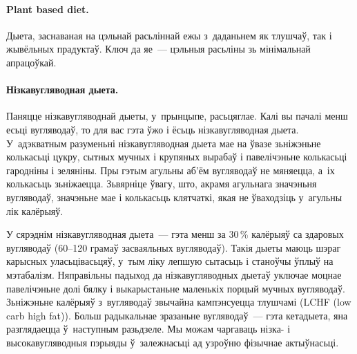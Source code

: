 \paragraph{Plant based diet.}
Дыета, заснаваная на цэльнай расьліннай ежы з~даданьнем як тлушчаў, так і жывёльных прадуктаў. Ключ да яе~--- цэльныя расьліны зь мінімальнай апрацоўкай.

\paragraph{Нізкавугляводная дыета.}
Паняцце нізкавугляводнай дыеты, у~прынцыпе, расьцяглае. Калі вы пачалі менш есьці вугляводаў, то для вас гэта ўжо і ёсьць нізкавугляводная дыета. У~адэкватным разуменьні нізкавугляводная дыета мае на ўвазе зьніжэньне колькасьці цукру, сытных мучных і крупяных вырабаў і павелічэньне колькасьці гародніны і зеляніны. Пры гэтым агульны аб'ём вугляводаў не мяняецца, а~іх колькасьць зьніжаецца. Зьвярніце ўвагу, што, акрамя агульнага значэньня вугляводаў, значэньне мае і колькасьць клятчаткі, якая не ўваходзіць у~агульны лік калёрыяў.

У сярэднім нізкавугляводная дыета~--- гэта менш за 30\,\% калёрыяў са здаровых вугляводаў (60--120 грамаў засваяльных вугляводаў). Такія дыеты маюць шэраг карысных уласьцівасьцяў, у~тым ліку лепшую сытасьць і станоўчы ўплыў на мэтабалізм. Няправільны падыход да нізкавугляводных дыетаў уключае моцнае павелічэньне долі бялку і выкарыстаньне маленькіх порцый мучных вугляводаў. Зьніжэньне калёрыяў з~вугляводаў звычайна кампэнсуецца тлушчамі (LCHF (low carb high fat)). Больш радыкальнае зразаньне вугляводаў~--- гэта кетадыета, яна разглядаецца ў~наступным разьдзеле. Мы можам чаргаваць нізка- і высокавугляводныя пэрыяды ў~залежнасьці ад узроўню фізычнае актыўнасьці.
